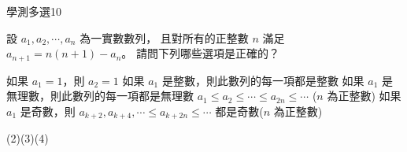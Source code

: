     \begin{QUESTION}
        \begin{ExamInfo}{99}{學測}{多選}{10}
        \end{ExamInfo}
        \begin{ExamAnsRateInfo}{34}{53}{33}{16}
        \end{ExamAnsRateInfo}
        \begin{QBODY}
            設 $a_{1},a_{2},\cdots,a_{n}$ 為一實數數列，
			且對所有的正整數 $n$ 滿足 $a_{n+1} = n(n+1) - a_{n}$。
			請問下列哪些選項是正確的？
			\begin{QOPS} 
				\QOP 如果 $a_{1}=1$，則 $a_{2}=1$
				\QOP 如果 $a_{1}$ 是整數，則此數列的每一項都是整數
				\QOP 如果 $a_{1}$ 是無理數，則此數列的每一項都是無理數
				\QOP $a_{1} \leq a_{2} \leq  \cdots \leq a_{2n} \leq \cdots $ ($n$ 為正整數)
				\QOP 如果 $a_{1}$ 是奇數，則 
			$a_{k+2}, a_{k+4} ,  \cdots \leq a_{k+2n} \leq \cdots $ 都是奇數($n$ 為正整數)
			\end{QOPS}
        \end{QBODY}
        \begin{QFROMS}
        \end{QFROMS}
        \begin{QTAGS}\end{QTAGS}
        \begin{QANS}
            (2)(3)(4)
        \end{QANS}
        \begin{QSOLLIST}
        \end{QSOLLIST}
        \begin{QEMPTYSPACE}
        \end{QEMPTYSPACE}
    \end{QUESTION}

